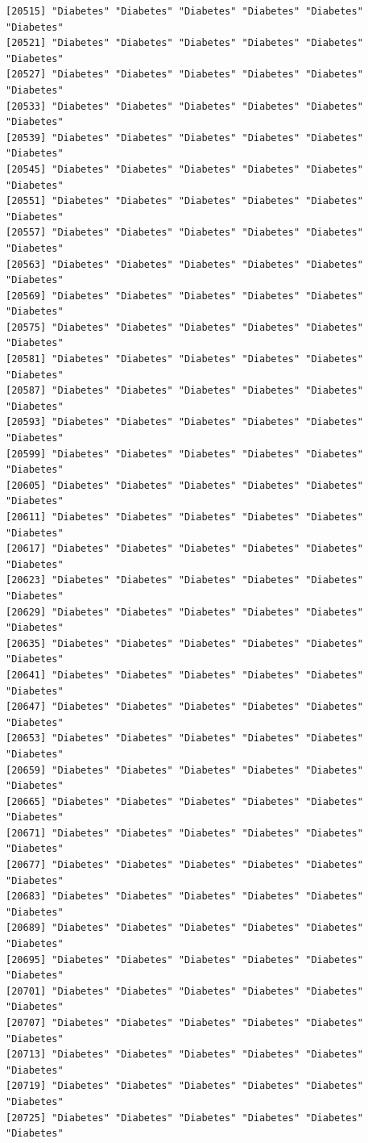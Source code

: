 \documentclass[
  letterpaper,
  DIV=11,
  numbers=noendperiod]{scrartcl}
\begin{document}
\begin{verbatim}
[20515] "Diabetes" "Diabetes" "Diabetes" "Diabetes" "Diabetes" "Diabetes"
[20521] "Diabetes" "Diabetes" "Diabetes" "Diabetes" "Diabetes" "Diabetes"
[20527] "Diabetes" "Diabetes" "Diabetes" "Diabetes" "Diabetes" "Diabetes"
[20533] "Diabetes" "Diabetes" "Diabetes" "Diabetes" "Diabetes" "Diabetes"
[20539] "Diabetes" "Diabetes" "Diabetes" "Diabetes" "Diabetes" "Diabetes"
[20545] "Diabetes" "Diabetes" "Diabetes" "Diabetes" "Diabetes" "Diabetes"
[20551] "Diabetes" "Diabetes" "Diabetes" "Diabetes" "Diabetes" "Diabetes"
[20557] "Diabetes" "Diabetes" "Diabetes" "Diabetes" "Diabetes" "Diabetes"
[20563] "Diabetes" "Diabetes" "Diabetes" "Diabetes" "Diabetes" "Diabetes"
[20569] "Diabetes" "Diabetes" "Diabetes" "Diabetes" "Diabetes" "Diabetes"
[20575] "Diabetes" "Diabetes" "Diabetes" "Diabetes" "Diabetes" "Diabetes"
[20581] "Diabetes" "Diabetes" "Diabetes" "Diabetes" "Diabetes" "Diabetes"
[20587] "Diabetes" "Diabetes" "Diabetes" "Diabetes" "Diabetes" "Diabetes"
[20593] "Diabetes" "Diabetes" "Diabetes" "Diabetes" "Diabetes" "Diabetes"
[20599] "Diabetes" "Diabetes" "Diabetes" "Diabetes" "Diabetes" "Diabetes"
[20605] "Diabetes" "Diabetes" "Diabetes" "Diabetes" "Diabetes" "Diabetes"
[20611] "Diabetes" "Diabetes" "Diabetes" "Diabetes" "Diabetes" "Diabetes"
[20617] "Diabetes" "Diabetes" "Diabetes" "Diabetes" "Diabetes" "Diabetes"
[20623] "Diabetes" "Diabetes" "Diabetes" "Diabetes" "Diabetes" "Diabetes"
[20629] "Diabetes" "Diabetes" "Diabetes" "Diabetes" "Diabetes" "Diabetes"
[20635] "Diabetes" "Diabetes" "Diabetes" "Diabetes" "Diabetes" "Diabetes"
[20641] "Diabetes" "Diabetes" "Diabetes" "Diabetes" "Diabetes" "Diabetes"
[20647] "Diabetes" "Diabetes" "Diabetes" "Diabetes" "Diabetes" "Diabetes"
[20653] "Diabetes" "Diabetes" "Diabetes" "Diabetes" "Diabetes" "Diabetes"
[20659] "Diabetes" "Diabetes" "Diabetes" "Diabetes" "Diabetes" "Diabetes"
[20665] "Diabetes" "Diabetes" "Diabetes" "Diabetes" "Diabetes" "Diabetes"
[20671] "Diabetes" "Diabetes" "Diabetes" "Diabetes" "Diabetes" "Diabetes"
[20677] "Diabetes" "Diabetes" "Diabetes" "Diabetes" "Diabetes" "Diabetes"
[20683] "Diabetes" "Diabetes" "Diabetes" "Diabetes" "Diabetes" "Diabetes"
[20689] "Diabetes" "Diabetes" "Diabetes" "Diabetes" "Diabetes" "Diabetes"
[20695] "Diabetes" "Diabetes" "Diabetes" "Diabetes" "Diabetes" "Diabetes"
[20701] "Diabetes" "Diabetes" "Diabetes" "Diabetes" "Diabetes" "Diabetes"
[20707] "Diabetes" "Diabetes" "Diabetes" "Diabetes" "Diabetes" "Diabetes"
[20713] "Diabetes" "Diabetes" "Diabetes" "Diabetes" "Diabetes" "Diabetes"
[20719] "Diabetes" "Diabetes" "Diabetes" "Diabetes" "Diabetes" "Diabetes"
[20725] "Diabetes" "Diabetes" "Diabetes" "Diabetes" "Diabetes" "Diabetes"

\end{verbatim}
\end{document}
